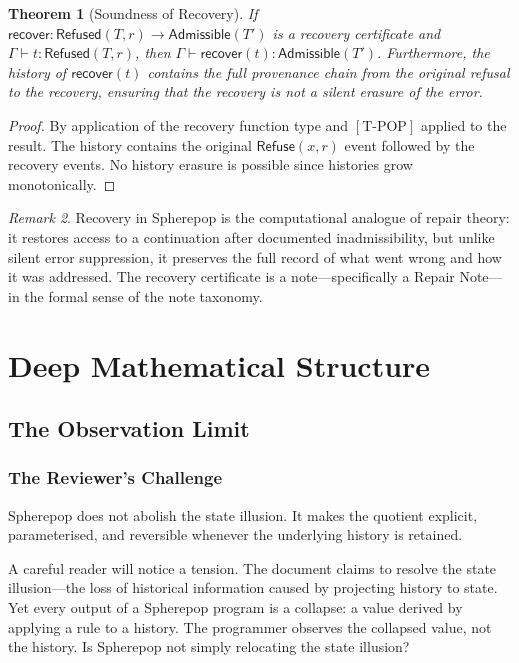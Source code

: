 \documentclass[12pt, a4paper, openany]{book}
\theoremstyle{plain}
\newtheorem{theorem}{Theorem}[chapter]
\theoremstyle{definition}
\theoremstyle{remark}
\newtheorem{remark}[theorem]{Remark}
\newcommand{\Refuse}{\mathsf{Refuse}}
\newcommand{\Adm}{\mathsf{Admissible}}
\newcommand{\Rfsd}{\mathsf{Refused}}
\begin{document}
\begin{theorem}[Soundness of Recovery]
If $\mathsf{recover} : \Rfsd(T, r) \to \Adm(T')$ is a recovery certificate and
$\Gamma \vdash t : \Rfsd(T, r)$, then $\Gamma \vdash \mathsf{recover}(t) : \Adm(T')$.
Furthermore, the history of $\mathsf{recover}(t)$ contains the full provenance
chain from the original refusal to the recovery, ensuring that the recovery is
not a silent erasure of the error.
\end{theorem}

\begin{proof}
By application of the recovery function type and $[\mathrm{T\text{-}POP}]$ applied
to the result. The history contains the original $\Refuse(x, r)$ event followed
by the recovery events. No history erasure is possible since histories grow
monotonically.
\end{proof}

\begin{remark}
Recovery in Spherepop is the computational analogue of repair theory: it restores
access to a continuation after documented inadmissibility, but unlike silent error
suppression, it preserves the full record of what went wrong and how it was
addressed. The recovery certificate is a note---specifically a Repair Note---in
the formal sense of the note taxonomy.
\end{remark}

\part{Deep Mathematical Structure}

\chapter{The Observation Limit}

\section{The Reviewer's Challenge}

Spherepop does not abolish the state illusion. It makes the quotient explicit,
parameterised, and reversible whenever the underlying history is retained.

A careful reader will notice a tension. The document claims to resolve the state
illusion---the loss of historical information caused by projecting history to
state. Yet every output of a Spherepop program is a collapse: a value derived by
applying a rule to a history. The programmer observes the collapsed value, not
the history. Is Spherepop not simply relocating the state illusion?
\end{document}
